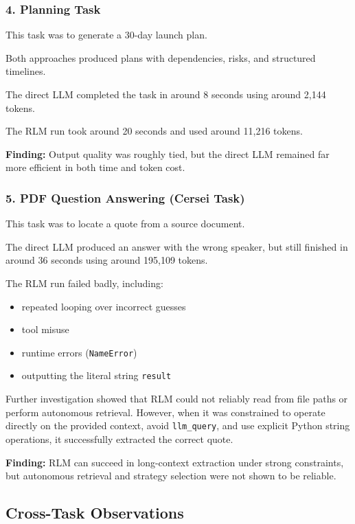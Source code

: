 \documentclass{article}
\begin{document}
\subsubsection{4. Planning Task}

This task was to generate a 30-day launch plan.

Both approaches produced plans with dependencies, risks, and structured timelines.

The direct LLM completed the task in around 8 seconds using around 2{,}144 tokens.

The RLM run took around 20 seconds and used around 11{,}216 tokens.

\textbf{Finding:} Output quality was roughly tied, but the direct LLM remained far more efficient in both time and token cost.

\subsubsection{5. PDF Question Answering (Cersei Task)}

This task was to locate a quote from a source document.

The direct LLM produced an answer with the wrong speaker, but still finished in around 36 seconds using around 195{,}109 tokens.

The RLM run failed badly, including:

\begin{itemize}
    \item repeated looping over incorrect guesses
    \item tool misuse
    \item runtime errors (\texttt{NameError})
    \item outputting the literal string \texttt{result}
\end{itemize}

Further investigation showed that RLM could not reliably read from file paths or perform autonomous retrieval. However, when it was constrained to operate directly on the provided context, avoid \texttt{llm\_query}, and use explicit Python string operations, it successfully extracted the correct quote.

\textbf{Finding:} RLM can succeed in long-context extraction under strong constraints, but autonomous retrieval and strategy selection were not shown to be reliable.

\subsection{Cross-Task Observations}
\end{document}
